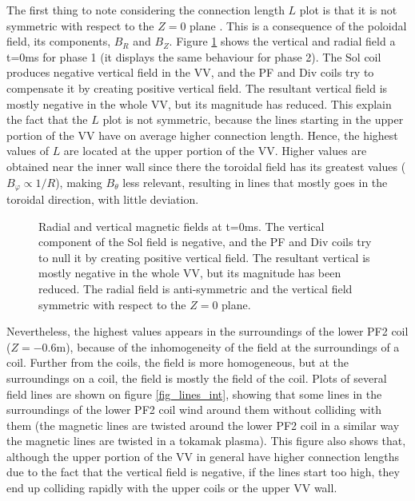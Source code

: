 \documentclass[a4paper,12pt,oneside]{book}
\begin{document}
The first thing to note considering the connection length $L$ plot is that it is not symmetric with respect to the $Z=0$ plane . This is a consequence of the poloidal field, its components, $B_R$ and $B_Z$. Figure \ref{fig_BR_BZ_int} shows the vertical and radial field a t=0ms for phase 1 (it displays the same behaviour for phase 2). The Sol coil produces negative vertical field in the VV, and the PF and Div coils try to compensate it by creating positive vertical field. The resultant vertical field is mostly negative in the whole VV, but its magnitude has reduced. This explain the fact that the $L$ plot is not symmetric, because the lines starting in the upper portion of the VV have on average higher connection length. Hence, the highest values of $L$ are located at the upper portion of the VV. Higher values are obtained near the inner wall since there the toroidal field has its greatest values ($B_\varphi \propto 1/R$), making $B_\theta$ less relevant, resulting in lines that mostly goes in the toroidal direction, with little deviation.

\begin{figure}[htbp]
\centering
{}
\hfill
{}

\caption{Radial and vertical magnetic fields at t=0ms. The vertical component of the Sol field is negative, and the PF and Div coils try to null it by creating positive vertical field. The resultant vertical is mostly negative in the whole VV, but its magnitude has been reduced. The radial field is anti-symmetric and the vertical field symmetric with respect to the $Z=0$ plane.}
\label{fig_BR_BZ_int}
\end{figure}

Nevertheless, the highest values appears in the surroundings of the lower PF2 coil ($Z=-0.6$m), because of the inhomogeneity of the field at the surroundings of a coil. Further from the coils, the field is more homogeneous, but at the surroundings on a coil, the field is mostly the field of the coil. Plots of several field lines are shown on figure \ref{fig_lines_int}, showing that some lines in the surroundings of the lower PF2 coil wind around them without colliding with them (the magnetic lines are twisted around the lower PF2 coil in a similar way the magnetic lines are twisted in a tokamak plasma). This figure also shows that, although the upper portion of the VV in general have higher connection lengths due to the fact that the vertical field is negative, if the lines start too high, they end up colliding rapidly with the upper coils or the upper VV wall.
\end{document}
